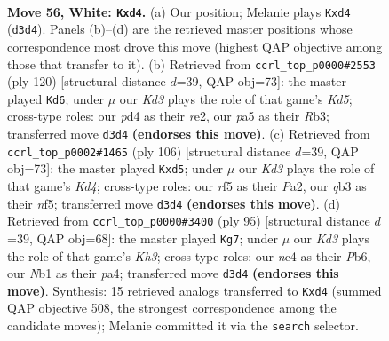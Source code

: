 \documentclass[11pt]{article}
\begin{document}
\clearpage

\begin{figure}[p]\centering
\begin{subfigure}{0.46\textwidth}\centering
\resizebox{\linewidth}{!}{%
\newchessgame
\chessboard[
  setfen={8/2k4p/8/p4r2/2np4/1q1K4/4P3/1N6 w - - 0 56},
  showmover=false,
  pgfstyle=straightmove, color=movearrow, markmove={d3-d4}
]}
\caption{}
\end{subfigure}\hfill
\begin{subfigure}{0.46\textwidth}\centering
\resizebox{\linewidth}{!}{%
\newchessgame
\chessboard[
  setfen={8/6k1/8/3Kp3/5n2/1R3P2/4rN2/8 w - - 10 61},
  showmover=false,
  pgfstyle=straightmove, color=movearrow, markmove={d5-d6}
]}
\caption{}
\end{subfigure}
\\[4pt]
\begin{subfigure}{0.46\textwidth}\centering
\resizebox{\linewidth}{!}{%
\newchessgame
\chessboard[
  setfen={8/1p3B2/1p6/3p1n2/3K1k2/2P5/P7/8 w - - 4 54},
  showmover=false,
  pgfstyle=straightmove, color=movearrow, markmove={d4-d5}
]}
\caption{}
\end{subfigure}\hfill
\begin{subfigure}{0.46\textwidth}\centering
\resizebox{\linewidth}{!}{%
\newchessgame
\chessboard[
  setfen={8/5p2/1p5k/7P/P4Q2/8/6PK/q7 b - - 8 48},
  showmover=false,
  pgfstyle=straightmove, color=movearrow, markmove={h6-g7}
]}
\caption{}
\end{subfigure}
\caption{\textbf{Move 56, White: \texttt{Kxd4}.} (a) Our position; Melanie plays \texttt{Kxd4} (\texttt{d3d4}). Panels (b)--(d) are the retrieved master positions whose correspondence most drove this move (highest QAP objective among those that transfer to it). (b) Retrieved from \texttt{ccrl\_top\_p0000\#2553} (ply 120) [structural distance $d$=39, QAP obj=73]: the master played \texttt{Kd6}; under $\mu$ our \emph{Kd3} plays the role of that game's \emph{Kd5}; cross-type roles: our \emph{p}d4 as their \emph{r}e2, our \emph{p}a5 as their \emph{R}b3; transferred move \texttt{d3d4} \textbf{(endorses this move)}. (c) Retrieved from \texttt{ccrl\_top\_p0002\#1465} (ply 106) [structural distance $d$=39, QAP obj=73]: the master played \texttt{Kxd5}; under $\mu$ our \emph{Kd3} plays the role of that game's \emph{Kd4}; cross-type roles: our \emph{r}f5 as their \emph{P}a2, our \emph{q}b3 as their \emph{n}f5; transferred move \texttt{d3d4} \textbf{(endorses this move)}. (d) Retrieved from \texttt{ccrl\_top\_p0000\#3400} (ply 95) [structural distance $d$=39, QAP obj=68]: the master played \texttt{Kg7}; under $\mu$ our \emph{Kd3} plays the role of that game's \emph{Kh3}; cross-type roles: our \emph{n}c4 as their \emph{P}b6, our \emph{N}b1 as their \emph{p}a4; transferred move \texttt{d3d4} \textbf{(endorses this move)}. Synthesis: 15 retrieved analogs transferred to \texttt{Kxd4} (summed QAP objective 508, the strongest correspondence among the candidate moves); Melanie committed it via the \texttt{search} selector.}
\label{fig:thought-m110}
\end{figure}
\end{document}
